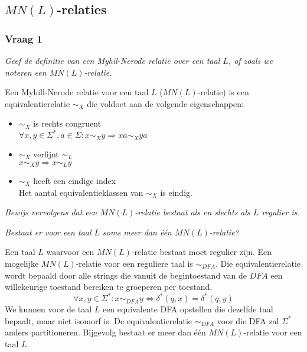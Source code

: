 \subsection{$MN(L)$-relaties}

\subsubsection{Vraag 1}

\textit{Geef de definitie van een Myhil-Nerode relatie over een taal $L$, of zoals we noteren een $MN(L)$-relatie.}

Een Myhill-Nerode relatie voor een taal $L$ ($MN(L)$-relatie) is een equivalentierelatie $\sim_X$ die voldoet aan de volgende eigenschappen:
  \begin{itemize}
  \item $\sim_X$ is rechts congruent\\$\forall x, y \in \Sigma^*, a \in \Sigma: x \sim_X y \Rightarrow xa \sim_X ya$
  \item $\sim_X$ verfijnt $\sim_L$\\$x \sim_X y \Rightarrow x \sim_L y$
  \item $\sim_X$ heeft een eindige index\\Het aantal equivalentieklassen van $\sim_X$ is eindig.
  \end{itemize}

\textit{Bewijs vervolgens dat een $MN(L)$-relatie bestaat als en slechts als $L$ regulier is.}



\textit{Bestaat er voor een taal $L$ soms meer dan één $MN(L)$-relatie?}

Een taal $L$ waarvoor een $MN(L)$-relatie bestaat moet regulier zijn. Een mogelijke $MN(L)$-relatie voor een reguliere taal is $\sim_{DFA}$. Die equivalentierelatie wordt bepaald door alle strings die vanuit de begintoestand van de $DFA$ een willekeurige toestand bereiken te groeperen per toestand.
\begin{equation*}
\forall x, y \in \Sigma^*: x \sim_{DFA} y \Leftrightarrow \delta^*(q, x) = \delta^*(q, y)
\end{equation*}
We kunnen voor de taal $L$ een equivalente DFA opstellen die dezelfde taal bepaalt, maar niet isomorf is. De equivalentierelatie $\sim_{DFA}$ voor die DFA zal $\Sigma^*$ anders partitioneren. Bijgevolg bestaat er meer dan \'e\'en $MN(L)$-relatie voor een taal $L$.